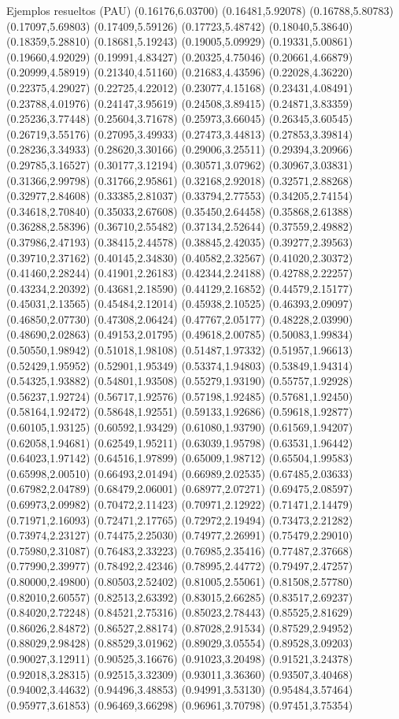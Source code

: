 \documentclass[11pt,a4paper]{article}
\begin{document}
\begin{fmex}{Ejemplos resueltos (PAU)}
(0.16176,6.03700) (0.16481,5.92078) (0.16788,5.80783) (0.17097,5.69803) (0.17409,5.59126) (0.17723,5.48742) (0.18040,5.38640) (0.18359,5.28810) (0.18681,5.19243) (0.19005,5.09929) (0.19331,5.00861) (0.19660,4.92029) (0.19991,4.83427) (0.20325,4.75046) (0.20661,4.66879) (0.20999,4.58919) (0.21340,4.51160) (0.21683,4.43596) (0.22028,4.36220) (0.22375,4.29027) (0.22725,4.22012) (0.23077,4.15168) (0.23431,4.08491) (0.23788,4.01976) (0.24147,3.95619) (0.24508,3.89415) (0.24871,3.83359) (0.25236,3.77448) (0.25604,3.71678) (0.25973,3.66045) (0.26345,3.60545) (0.26719,3.55176) (0.27095,3.49933) (0.27473,3.44813) (0.27853,3.39814) (0.28236,3.34933) (0.28620,3.30166) (0.29006,3.25511) (0.29394,3.20966) (0.29785,3.16527) (0.30177,3.12194) (0.30571,3.07962) (0.30967,3.03831) (0.31366,2.99798) (0.31766,2.95861) (0.32168,2.92018) (0.32571,2.88268) (0.32977,2.84608) (0.33385,2.81037) (0.33794,2.77553) (0.34205,2.74154) (0.34618,2.70840) (0.35033,2.67608) (0.35450,2.64458) (0.35868,2.61388) (0.36288,2.58396) (0.36710,2.55482) (0.37134,2.52644) (0.37559,2.49882) (0.37986,2.47193) (0.38415,2.44578) (0.38845,2.42035) (0.39277,2.39563) (0.39710,2.37162) (0.40145,2.34830) (0.40582,2.32567) (0.41020,2.30372) (0.41460,2.28244) (0.41901,2.26183) (0.42344,2.24188) (0.42788,2.22257) (0.43234,2.20392) (0.43681,2.18590) (0.44129,2.16852) (0.44579,2.15177) (0.45031,2.13565) (0.45484,2.12014) (0.45938,2.10525) (0.46393,2.09097) (0.46850,2.07730) (0.47308,2.06424) (0.47767,2.05177) (0.48228,2.03990) (0.48690,2.02863) (0.49153,2.01795) (0.49618,2.00785) (0.50083,1.99834) (0.50550,1.98942) (0.51018,1.98108) (0.51487,1.97332) (0.51957,1.96613) (0.52429,1.95952) (0.52901,1.95349) (0.53374,1.94803) (0.53849,1.94314) (0.54325,1.93882) (0.54801,1.93508) (0.55279,1.93190) (0.55757,1.92928) (0.56237,1.92724) (0.56717,1.92576) (0.57198,1.92485) (0.57681,1.92450) (0.58164,1.92472) (0.58648,1.92551) (0.59133,1.92686) (0.59618,1.92877) (0.60105,1.93125) (0.60592,1.93429) (0.61080,1.93790) (0.61569,1.94207) (0.62058,1.94681) (0.62549,1.95211) (0.63039,1.95798) (0.63531,1.96442) (0.64023,1.97142) (0.64516,1.97899) (0.65009,1.98712) (0.65504,1.99583) (0.65998,2.00510) (0.66493,2.01494) (0.66989,2.02535) (0.67485,2.03633) (0.67982,2.04789) (0.68479,2.06001) (0.68977,2.07271) (0.69475,2.08597) (0.69973,2.09982) (0.70472,2.11423) (0.70971,2.12922) (0.71471,2.14479) (0.71971,2.16093) (0.72471,2.17765) (0.72972,2.19494) (0.73473,2.21282) (0.73974,2.23127) (0.74475,2.25030) (0.74977,2.26991) (0.75479,2.29010) (0.75980,2.31087) (0.76483,2.33223) (0.76985,2.35416) (0.77487,2.37668) (0.77990,2.39977) (0.78492,2.42346) (0.78995,2.44772) (0.79497,2.47257) (0.80000,2.49800) (0.80503,2.52402) (0.81005,2.55061) (0.81508,2.57780) (0.82010,2.60557) (0.82513,2.63392) (0.83015,2.66285) (0.83517,2.69237) (0.84020,2.72248) (0.84521,2.75316) (0.85023,2.78443) (0.85525,2.81629) (0.86026,2.84872) (0.86527,2.88174) (0.87028,2.91534) (0.87529,2.94952) (0.88029,2.98428) (0.88529,3.01962) (0.89029,3.05554) (0.89528,3.09203) (0.90027,3.12911) (0.90525,3.16676) (0.91023,3.20498) (0.91521,3.24378) (0.92018,3.28315) (0.92515,3.32309) (0.93011,3.36360) (0.93507,3.40468) (0.94002,3.44632) (0.94496,3.48853) (0.94991,3.53130) (0.95484,3.57464) (0.95977,3.61853) (0.96469,3.66298) (0.96961,3.70798) (0.97451,3.75354) 
\end{fmex}
\end{document}
